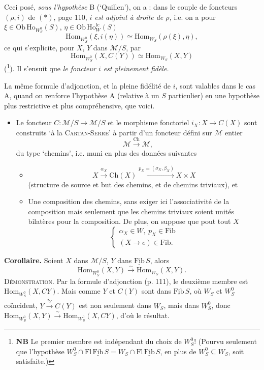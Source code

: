 \documentclass[11pt]{article}
\newcommand{\printedpage}[1]{\marginpar{\footnotesize p.~#1}}
\newcommand{\msp}[1]{\marginpar{\footnotesize [#1]}}
\newcommand{\Fib}{\underline{\mathrm{Fib}}\,}
\newcommand{\Ho}{\mathrm{Ho}}
\newcommand{\Hom}{\mathrm{Hom}}
\newcommand{\Fl}{\mathrm{Fl}}
\newcommand{\M}{\mathcal{M}}
\begin{document}
Ceci posé, \textit{sous l'hypothèse} B (‘Quillen’), on a : dans le couple de foncteurs $(\rho, i)$ de $(*)$, page 110, \textit{$i$ est adjoint à droite de $\rho$,} i.e. on a pour $\xi \in \mathrm{Ob}\,\Ho_{W_S^0}(S)$, $\eta \in \mathrm{Ob}\,\Ho^{\mathrm{lc}}_W(S)$
\[\Hom_{W_S^0}(\xi, i(\eta)) \simeq \Hom_{W_S}(\rho(\xi), \eta),\]
ce qui s'explicite, pour $X$, $Y$ dans $\M/S$, par
\[\boxed{\Hom_{W_S^0}(X, C(Y)) \simeq \Hom_{W_S}(X, Y)}\]
(\footnote{\textbf{NB} Le premier membre est indépendant du choix de $W_S^0$! (Pourvu seulement que l'hypothèse $W_S^0 \cap \Fl\,\Fib S = W_S \cap \Fl\,\Fib S$, en plus de $W_S^0 \subseteq W_S$, soit satisfaite.)}). Il s'ensuit que \textit{le foncteur $i$ est pleinement fidèle.}

La même formule d'adjonction, et la
\msp{page 112}
pleine fidélité de $i$, sont valables dans le cas A, quand on renforce l'hypothèse A (relative à un $S$ particulier) en une hypothèse plus restrictive et plus compréhensive, que voici.

\begin{itemize}[leftmargin=3em]
\item[A$'$)] Le foncteur $C : \M/S \longrightarrow \M/S$ et le morphisme fonctoriel $i_X : X \longrightarrow C(X)$ sont construits ‘à la \textsc{Cartan-Serre}’ à partir d'un foncteur défini sur $\M$ entier
\[\M \xrightarrow{\mathrm{Ch}} \M,\]
du type ‘chemins’, i.e. muni en plus des données suivantes
\begin{itemize}[leftmargin=3em]
\item[a)] \[X \xrightarrow{\alpha_X} \mathrm{Ch}(X) \xrightarrow{p_X = (\sigma_X, \beta_X)} X \times X\]
(structure de source et but des chemins, et de chemins triviaux), et
\item[b)] Une composition des chemins, sans exiger ici l'associativité de la composition mais seulement que les chemins triviaux soient unités bilatères pour la composition. De plus, on suppose que pout tout $X$ %
\[\begin{cases} \alpha_X \in W,\ p_X \in \mathrm{Fib} \\ (X \longrightarrow e) \in \mathrm{Fib}. \end{cases}\]
\end{itemize}
\end{itemize}

\printedpage{71}
\msp{page 113}
\textbf{Corollaire.} Soient $X$ dans $\M/S$, $Y$ dans $\Fib S$, alors
\[\Hom_{W_S^0}(X, Y) \xrightarrow{\sim} \Hom_{W_S}(X, Y).\]
\textsc{Démonstration}. Par la formule d'adjonction (p. 111), le deuxième membre est $\Hom_{W_S^0}(X, CY)$. Mais comme $Y$ et $C(Y)$ sont dans $\Fib S$, où $W_S$ et $W_S^0$ coïncident, $Y \xrightarrow{i_Y} C(Y)$ est non seulement dans $W_S$, mais dans $W_S^0$, donc $\Hom_{W_S^0}(X, Y) \xrightarrow{\sim} \Hom_{W_S^0}(X, CY)$, d'où le résultat.
\end{document}
